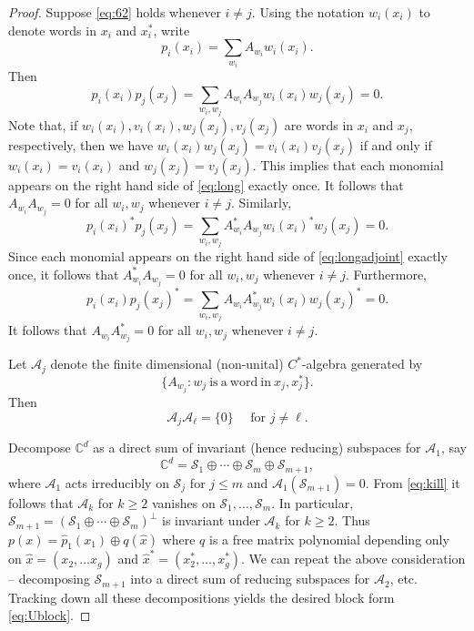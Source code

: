 \documentclass[12pt,makeidx]{amsart}
\def\beq{\begin{equation}}
\def\eeq{\end{equation}}
\numberwithin{equation}{section}
\def\C{ {\mathbb{C}} }
\def\cA{ {\mathcal A} }
\def\cS{{\mathcal S} }
\def\cS{{\mathcal S}}
\begin{document}
\begin{proof}

Suppose \eqref{eq:62} holds
 whenever $i \neq j$. Using the notation $w_i (x_i)$ to denote words in $x_i$ and $x_i^*$, write 
 \[p_i (x_i)=\sum_{w_i} A_{w_i} w_i (x_i).\]
  Then
\beq\label{eq:long}
p_i (x_i) p_j(x_j)= 
\sum_{w_i,w_j} A_{w_i} A_{w_j} w_i (x_i) w_j (x_j)=0.
\eeq
Note that, if $w_i(x_i),v_i (x_i), w_j(x_j),v_j(x_j)$ are words in $x_i$ and $x_j$, respectively, then we have $w_i (x_i) w_j(x_j)=v_i(x_i) v_j(x_j)$ if and only if $w_i(x_i)=v_i(x_i)$ and $w_j (x_j)= v_j(x_j)$. This implies that each monomial appears on the right hand side of \eqref{eq:long} exactly once. 
It follows that $A_{w_i} A_{w_j} =0$ for all $w_i, w_j$ whenever $i \neq j$. 
Similarly,
\beq\label{eq:longadjoint}
p_i (x_i)^* p_j(x_j)= 
\sum_{w_i,w_j} A_{w_i}^* A_{w_j} w_i (x_i)^* w_j (x_j)=0.
\eeq
Since each monomial appears on the right hand side of \eqref{eq:longadjoint} exactly once,
it follows that $A_{w_i}^* A_{w_j} =0$ for all $w_i, w_j$ whenever $i \neq j$.
Furthermore, 
\beq\label{eq:longgrammian}
p_i (x_i) p_j(x_j)^*= 
\sum_{w_i,w_j} A_{w_i} A_{w_j}^* w_i (x_i) w_j (x_j)^*=0.
\eeq
It follows that $A_{w_i} A_{w_j}^* =0$ for all $w_i, w_j$ whenever $i \neq j$. 

Let $\cA_j$ denote the finite dimensional (non-unital) $C^*$-algebra generated by  
\[\{A_{w_j}: w_j \mathrm{\  is \ a \ word \ in \ } x_j,x_j^*\}.\]
 Then 
\beq\label{eq:kill}
\cA_j \cA_\ell = \{0\}\quad\text{ for $j\neq \ell$}.
\eeq 

Decompose $\C^d$ as a direct sum of invariant (hence reducing) subspaces  for $\cA_1$,
say
\[
\C^d= \cS_1\oplus \cdots\oplus \cS_m \oplus \cS_{m+1},
\]
where $\cA_1$ acts irreducibly on $\cS_j$ for $j\leq m$ and $\cA_1(\cS_{m+1})=0$.
From \eqref{eq:kill} it follows that $\cA_k$ for $k\geq2$ vanishes on $\cS_1,\ldots,\cS_m$.
In particular, $\cS_{m+1}= (\cS_1\oplus \cdots\oplus \cS_m )^\perp$ is invariant under $\cA_k$ for $k \geq 2$. Thus $p(x)= \hat{p}_1 (x_1) \oplus q(\hat{x})$ where $q$ is a free matrix polynomial depending only on $\hat{x}=(x_2, \dots x_g)$ and $\hat{x}^*=(x_2^*, \dots, x_g^*)$.
We can repeat the above consideration -- decomposing $\cS_{m+1}$ into a direct sum of reducing subspaces  for $\cA_2$, etc.
Tracking down all these decompositions yields the desired block form \eqref{eq:Ublock}.
\end{proof}
\end{document}
